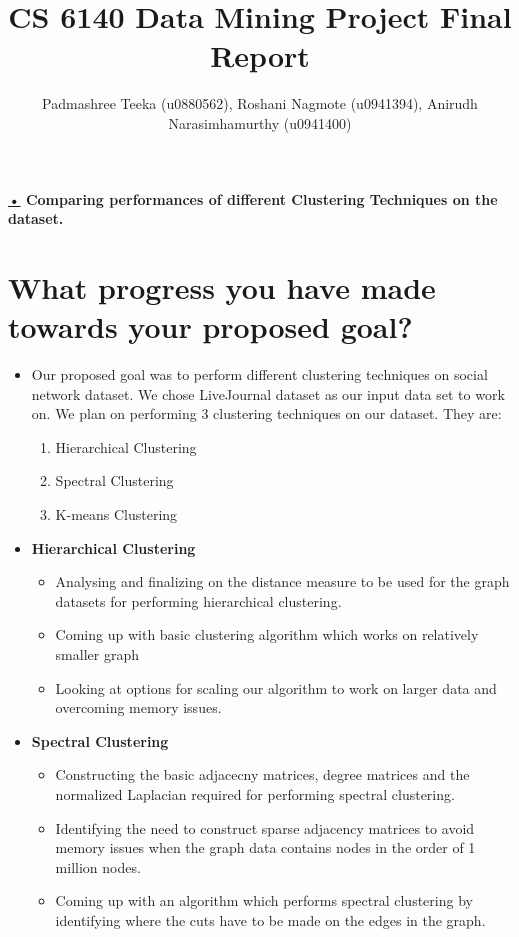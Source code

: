 \documentclass[11pt]{exam}
\title{CS 6140 Data Mining Project Final Report}
\author{Padmashree Teeka (u0880562), Roshani Nagmote (u0941394), Anirudh Narasimhamurthy (u0941400)}
\begin{document}
\maketitle

\textbf{\underline{•} Comparing performances of different Clustering Techniques on the dataset.}

%
%

\section{What progress you have made towards your proposed goal?}

\begin{itemize}
	
 \item[] Our proposed goal was to perform different clustering techniques on social network dataset. We chose LiveJournal dataset as our input data set to work on. We plan on performing 3 clustering techniques on our dataset. They are: 
\begin{enumerate}
	
\item  Hierarchical Clustering
\item  Spectral Clustering
\item  K-means Clustering 

\end{enumerate}

\item \textbf{Hierarchical Clustering}
\begin{itemize}
\item  Analysing and finalizing on the distance measure to be used for the graph datasets for performing hierarchical clustering.
\item Coming up with basic clustering algorithm which works on relatively smaller graph
\item Looking at options for scaling our algorithm to work on larger data and overcoming memory issues.
\end{itemize}

\item \textbf{Spectral Clustering}

\begin{itemize}

\item Constructing the basic adjacecny matrices, degree matrices and the normalized Laplacian required for performing spectral clustering.
\item Identifying the need to construct sparse adjacency matrices to avoid memory issues when the graph data contains nodes in the order of 1 million nodes.
\item Coming up with an algorithm which performs spectral clustering by identifying where the cuts have to be made on the edges in the graph.

\end{itemize}	


\end{itemize}
\end{document}
